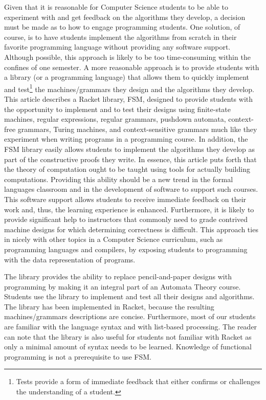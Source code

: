 \documentclass{eptcs}
\begin{document}
Given that it is reasonable for Computer Science students to be able to experiment with and get feedback on the algorithms they develop, a decision must be made as to how to engage programming students. One solution, of course, is to have students implement the algorithms from scratch in their favorite programming language without providing any software support. Although possible, this approach is likely to be too time-consuming within the confines of one semester. A more reasonable approach is to provide students with a library (or a programming language) that allows them to quickly implement and test\footnote{Tests provide a form of immediate feedback that either confirms or challenges the understanding of a student.} the machines/grammars they design and the algorithms they develop. This article describes a \textsf{Racket} library, \textsf{FSM}, designed to provide students with the opportunity to implement and to test their designs using finite-state machines, regular expressions, regular grammars, pushdown automata, context-free grammars, Turing machines, and context-sensitive grammars much like they experiment when writing programs in a programming course. In addition, the \textsf{FSM} library easily allows students to implement the algorithms they develop as part of the constructive proofs they write. In essence, this article puts forth that the theory of computation ought to be taught using tools for actually building computations. Providing this ability should be a new trend in the formal languages classroom and in the development of software to support such courses. This software support allows students to receive immediate feedback on their work and, thus, the learning experience is enhanced. Furthermore, it is likely to provide significant help to instructors that commonly need to grade contrived machine designs for which determining correctness is difficult. This approach ties in nicely with other topics in a Computer Science curriculum, such as programming languages and compilers, by exposing students to programming with the data representation of programs.

The library provides the ability to replace pencil-and-paper designs with programming by making it an integral part of an Automata Theory course. Students use the library to implement and test all their designs and algorithms. The library has been implemented in \textsf{Racket}, because the resulting machines/grammars descriptions are concise.  Furthermore, most of our students are familiar with the language syntax and with list-based processing. The reader can note that the library is also useful for students not familiar with \textsf{Racket} as only a minimal amount of syntax needs to be learned. Knowledge of functional programming is not a prerequisite to use \textsf{FSM}.
\end{document}
